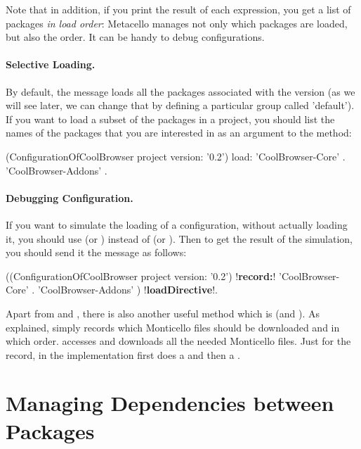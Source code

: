 \documentclass[a4paper,10pt,twoside]{book}
\begin{document}
Note that in addition, if you print the result of each expression, you get a list of packages \emph{in load order}: Metacello manages not only which packages are loaded, but also the order. It can be handy to debug configurations.

\paragraph{Selective Loading.} By default, the  message loads all the packages associated with the version (as we will see later, we can change that by defining a particular group called 'default'). If you want to load a subset of the packages in a project, you should list 
the names of the packages that you are interested in as an argument to the  method:

\begin{code}{}
  (ConfigurationOfCoolBrowser project version: '0.2') load: 
  		{ 'CoolBrowser-Core' . 
  		'CoolBrowser-Addons' }.
\end{code}


\paragraph{Debugging Configuration.}
If you want to simulate the loading of a configuration, without actually loading it, you should use  (or ) instead of  (or ). Then to get the result of the simulation, you should send it the message  as follows:

\begin{code}{}
  ((ConfigurationOfCoolBrowser project version: '0.2') !\textbf{record:}! 
  		{ 'CoolBrowser-Core' .
		'CoolBrowser-Addons' }) !\textbf{loadDirective}!.
\end{code} 

Apart from  and , there is also another useful method  which is  (and ). As explained,  simply records which Monticello files should be downloaded and in which order.   accesses and downloads all the needed Monticello files. Just for the record, in the implementation  first does a  and then a . 

\section{Managing Dependencies between Packages}
\end{document}
